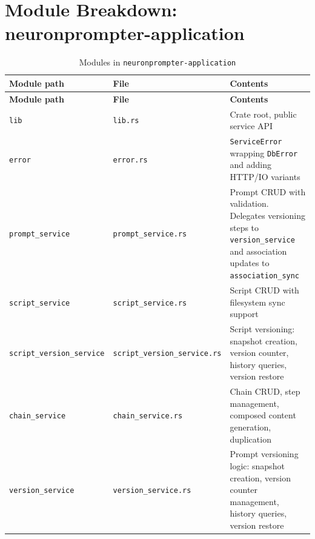\documentclass[a4paper, 11pt, oneside]{report}
\begin{document}
\section{Module Breakdown: neuronprompter-application}
\label{sec:mod-application}

{\footnotesize
\begin{longtable}{L{4cm} L{4.8cm} L{5.8cm}}
  \caption{Modules in \texttt{neuronprompter-application}}
  \label{tab:mod-application} \\
  \toprule
  \textbf{Module path} & \textbf{File} & \textbf{Contents} \\
  \midrule
  \endfirsthead
  \toprule
  \textbf{Module path} & \textbf{File} & \textbf{Contents} \\
  \midrule
  \endhead
  \texttt{lib}               & \texttt{lib.rs}          & Crate root, public service API \\
  \texttt{error}             & \texttt{error.rs}        & \texttt{ServiceError} wrapping \texttt{DbError}
                                                           and adding HTTP/IO variants \\
  \texttt{prompt\_service}   & \texttt{prompt\_service.rs} & Prompt CRUD with validation.  Delegates
                                                             versioning steps to \texttt{version\_service}
                                                             and association updates to
                                                             \texttt{association\_sync} \\
  \texttt{script\_service}   & \texttt{script\_service.rs} & Script CRUD with filesystem sync support \\
  \texttt{script\_version\_service} & \texttt{script\_version\_service.rs} & Script versioning:
                                                             snapshot creation, version counter,
                                                             history queries, version restore \\
  \texttt{chain\_service}    & \texttt{chain\_service.rs}  & Chain CRUD, step management,
                                                             composed content generation, duplication \\
  \texttt{version\_service}  & \texttt{version\_service.rs}& Prompt versioning logic: snapshot creation,
                                                             version counter management, history
                                                             queries, version restore \\

\end{longtable}}
\end{document}
